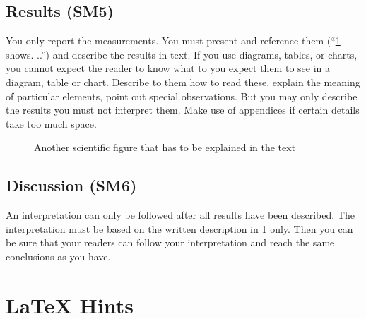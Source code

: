 \documentclass[
  numbers=noenddot,
  english,  %
  a4paper,  %
  twoside,  %
  bibliography=totoc,
  headsepline,
  cleardoublepage=empty,
  parskip=half,
  draft=false
]{scrbook}
\theoremstyle{break}
\begin{document}
\section{Results (SM5)}\label{sec:evaluation:results}

You only report the measurements.
You must present and reference them (``\cref{fig:my_label2} shows.
..'') and describe the results in text.
If you use diagrams, tables, or charts, you cannot expect the reader to know what to you expect them to see in a diagram, table or chart.
Describe to them how to read these, explain the meaning of particular elements, point out special observations.
But you may only describe the results you must not interpret them.
Make use of appendices if certain details take too much space.

\begin{figure}
  \centering
  \caption{Another scientific figure that has to be explained in the text}
  \label{fig:my_label2}
\end{figure}

\section{Discussion (SM6)}\label{sec:evaluation:discussion}

An interpretation can only be followed after all results have been described.
The interpretation must be based on the written description in \cref{sec:evaluation:results} only.
Then you can be sure that your readers can follow your interpretation and reach the same conclusions as you have.


\chapter{LaTeX Hints}
\label{sec:latexhints}

\newcount\LTGbeginlineexample
\newcount\LTGendlineexample
\newenvironment{ltgexample}%
{\LTGbeginlineexample=\numexpr\inputlineno+1\relax}%
{\LTGendlineexample=\numexpr\inputlineno-1\relax%
  \tcbinputlisting{%
    listing only,
    listing file=\currfilepath,
    colback=green!5!white,
    colframe=green!25,
    coltitle=black!90,
    coltext=black!90,
    left=8mm,
    title=Corresponding \LaTeX{} code of \texttt{\currfilepath},
    minted language=TeX,
    minted style=vs,
    minted options={
        fontsize=\footnotesize,
        firstline=\the\LTGbeginlineexample,
        lastline=\the\LTGendlineexample,
        firstnumber=\the\LTGbeginlineexample,
        breaklines,
        linenos,
        numbersep=8pt
      }
  }
}%
\end{document}
